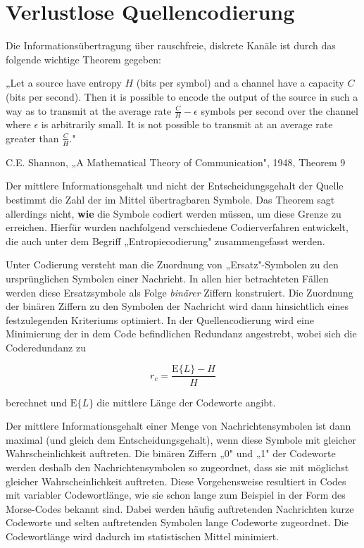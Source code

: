 \section{Verlustlose Quellencodierung}
\label{sec:quellencodierung}

Die Informationsübertragung über rauschfreie, diskrete Kanäle ist durch das folgende wichtige Theorem gegeben:

\begin{satz}
„Let a source have entropy $H$ (bits per symbol) and a channel have a capacity $C$ (bits per second). Then it is possible to encode the output of the source in such a way as to transmit at the average rate $\frac{C}{H} - \epsilon$ symbols per second over the channel where $\epsilon$ is arbitrarily small. It is not possible to transmit at an average rate greater than $\frac{C}{H}$."

\hfill C.E. Shannon, „A Mathematical Theory of Communication", 1948, Theorem 9
\end{satz}

Der mittlere Informationsgehalt und nicht der Entscheidungsgehalt der Quelle bestimmt die Zahl der im Mittel übertragbaren Symbole. Das Theorem sagt allerdings nicht, \textbf{wie} die Symbole codiert werden müssen, um diese Grenze zu erreichen. Hierfür wurden nachfolgend verschiedene Codierverfahren entwickelt, die auch unter dem Begriff „Entropiecodierung" zusammengefasst werden.

Unter Codierung versteht man die Zuordnung von „Ersatz"-Symbolen zu den ursprünglichen Symbolen einer Nachricht. In allen hier betrachteten Fällen werden diese Ersatzsymbole als Folge \textit{binärer} Ziffern konstruiert. Die Zuordnung der binären Ziffern zu den Symbolen der Nachricht wird dann hinsichtlich eines festzulegenden Kriteriums optimiert. In der Quellencodierung wird eine Minimierung der in dem Code befindlichen Redundanz angestrebt, wobei sich die Coderedundanz zu

$$
r_c = \frac{\mathrm{E}\{L\} - H}{H}
$$

berechnet und $\mathrm{E}\{L\}$ die mittlere Länge der Codeworte angibt.

Der mittlere Informationsgehalt einer Menge von Nachrichtensymbolen ist dann maximal (und gleich dem Entscheidungsgehalt), wenn diese Symbole mit gleicher Wahrscheinlichkeit auftreten. Die binären Ziffern „0" und „1" der Codeworte werden deshalb den Nachrichtensymbolen so zugeordnet, dass sie mit möglichst gleicher Wahrscheinlichkeit auftreten. Diese Vorgehensweise resultiert in Codes mit variabler Codewortlänge, wie sie schon lange zum Beispiel in der Form des Morse-Codes bekannt sind. Dabei werden häufig auftretenden Nachrichten kurze Codeworte und selten auftretenden Symbolen lange Codeworte zugeordnet. Die Codewortlänge wird dadurch im statistischen Mittel minimiert.


